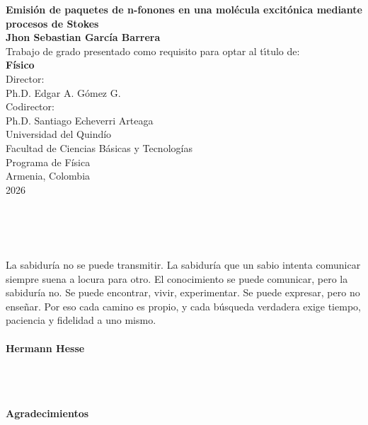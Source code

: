 \newpage{\pagestyle{empty}\cleardoublepage}

\newpage
\begin{center}
\thispagestyle{empty} \vspace*{0.5cm} \textbf{\huge Emisión de paquetes de n-fonones en una molécula excitónica mediante procesos de Stokes}\\[3.0cm]
\Large\textbf{Jhon Sebastian García Barrera}\\[3.5cm]
\small Trabajo de grado presentado como requisito para optar al
t\'{\i}tulo de:\\
\textbf{Físico}\\[3.0cm]
Director:\\
Ph.D. Edgar A. Gómez G.\\
Codirector:\\
Ph.D. Santiago Echeverri Arteaga\\[3.0cm]
Universidad del Quindío\\
Facultad de Ciencias Básicas y Tecnologías\\
Programa de Física\\
Armenia, Colombia\\
2026\\
\end{center}

\newpage{\pagestyle{empty}\cleardoublepage}

\newpage
\thispagestyle{empty} \textbf{}\normalsize
\\\\\\%
[4.0cm]

\begin{flushright}
\begin{minipage}{10cm}
    \noindent
        \small
        La sabiduría no se puede transmitir. La sabiduría que un sabio intenta comunicar siempre suena a locura para otro. El conocimiento se puede comunicar, pero la sabiduría no. Se puede encontrar, vivir, experimentar. Se puede expresar, pero no enseñar. Por eso cada camino es propio, y cada búsqueda verdadera exige tiempo, paciencia y fidelidad a uno mismo.\\\\
        \textbf{Hermann Hesse}\\
\end{minipage}
\end{flushright}

\newpage{\pagestyle{empty}\cleardoublepage}

\newpage
\thispagestyle{empty} \textbf{}\normalsize
\\\\\\%
\textbf{\LARGE Agradecimientos}
\\\\

